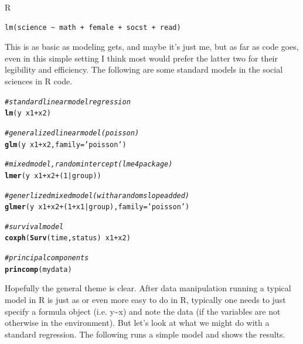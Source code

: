 \documentclass[english,nohyper,titlepage]{tufte-handout}\usepackage[]{graphicx}\usepackage[]{color}
\makeatletter
\newcommand{\hlnum}[1]{\textcolor[rgb]{0.686,0.059,0.569}{#1}}%
\newcommand{\hlstr}[1]{\textcolor[rgb]{0.192,0.494,0.8}{#1}}%
\newcommand{\hlcom}[1]{\textcolor[rgb]{0.678,0.584,0.686}{\textit{#1}}}%
\newcommand{\hlopt}[1]{\textcolor[rgb]{0,0,0}{#1}}%
\newcommand{\hlstd}[1]{\textcolor[rgb]{0.345,0.345,0.345}{#1}}%
\newcommand{\hlkwc}[1]{\textcolor[rgb]{0.333,0.667,0.333}{#1}}%
\newcommand{\hlkwd}[1]{\textcolor[rgb]{0.737,0.353,0.396}{\textbf{#1}}}%
\newenvironment{kframe}{%
 \def\at@end@of@kframe{}%
 \ifinner\ifhmode%
  \def\at@end@of@kframe{\end{minipage}}%
  \begin{minipage}{\columnwidth}%
 \fi\fi%
 \def\FrameCommand##1{\hskip\@totalleftmargin \hskip-\fboxsep
 \colorbox{shadecolor}{##1}\hskip-\fboxsep
     \hskip-\linewidth \hskip-\@totalleftmargin \hskip\columnwidth}%
 \MakeFramed {\advance\hsize-\width
   \@totalleftmargin\z@ \linewidth\hsize
   \@setminipage}}%
 {\par\unskip\endMakeFramed%
 \at@end@of@kframe}
\newenvironment{knitrout}{}{} %
\makeatother
\begin{document}
\noindent R
\begin{footnotesize}
\begin{verbatim}
lm(science ~ math + female + socst + read)
\end{verbatim}
\end{footnotesize}
This is as basic as modeling gets, and maybe it's just me, but as far as code goes, even in this simple setting I think most would prefer the latter two for their legibility and efficiency. The following are some standard models in the social sciences in R code.

\begin{knitrout}\footnotesize
{}\color{fgcolor}\begin{kframe}
\begin{alltt}
\hlcom{# standard linear model regression}
\hlkwd{lm}\hlstd{(y} \hlopt{~} \hlstd{x1} \hlopt{+} \hlstd{x2)}

\hlcom{# generalized linear model (poisson)}
\hlkwd{glm}\hlstd{(y} \hlopt{~} \hlstd{x1} \hlopt{+} \hlstd{x2,} \hlkwc{family}\hlstd{=}\hlstr{'poisson'}\hlstd{)}

\hlcom{# mixed model, random intercept (lme4 package)}
\hlkwd{lmer}\hlstd{(y} \hlopt{~} \hlstd{x1} \hlopt{+} \hlstd{x2} \hlopt{+} \hlstd{(}\hlnum{1}\hlopt{|}\hlstd{group))}

\hlcom{# generlized mixed model (with a random slope added)}
\hlkwd{glmer}\hlstd{(y} \hlopt{~} \hlstd{x1} \hlopt{+} \hlstd{x2} \hlopt{+} \hlstd{(}\hlnum{1} \hlopt{+} \hlstd{x1}\hlopt{|}\hlstd{group),} \hlkwc{family}\hlstd{=}\hlstr{'poisson'}\hlstd{)}

\hlcom{# survival model}
\hlkwd{coxph}\hlstd{(}\hlkwd{Surv}\hlstd{(time, status)} \hlopt{~} \hlstd{x1} \hlopt{+} \hlstd{x2)}

\hlcom{# principal components}
\hlkwd{princomp}\hlstd{(mydata)}
\end{alltt}
\end{kframe}
\end{knitrout}

Hopefully the general theme is clear.  After data manipulation running a typical model in R is just as or even more easy to do in R, typically one needs to just specify a formula object (i.e. y\textasciitilde x) and note the data (if the variables are not otherwise in the environment).  But let's look at what we might do with a standard regression. The following runs a simple model and shows the results.
\end{document}
